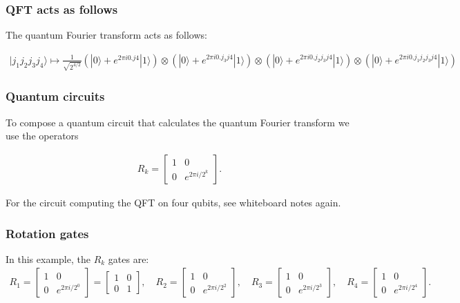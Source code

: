 \documentclass{beamer}
\begin{document}
\begin{frame}
\frametitle{QFT acts as follows}

The quantum Fourier transform acts as follows:

\begin{align*}
|j_1j_2j_3j_4 \rangle \mapsto \frac{1}{\sqrt{2^{4/2}}}
\left(|0\rangle + e^{2 \pi i 0.j4}|1\rangle \right) \otimes 
\left(|0\rangle + e^{2 \pi i 0.j_3j4}|1\rangle \right) \otimes 
\left(|0\rangle + e^{2 \pi i 0.j_2j_3j4}|1\rangle \right) \otimes 
\left(|0\rangle + e^{2 \pi i 0.j_1j_2j_3j4}|1\rangle \right) 
\end{align*}
\end{frame}

\begin{frame}
\frametitle{Quantum circuits}

To compose a quantum circuit that calculates the quantum Fourier
transform we use the operators

\begin{align*}
R_k = 
\begin{bmatrix}
1 & 0 \\
0 & e^{2\pi i/2^k}
\end{bmatrix}.
\end{align*}

For the circuit computing the QFT on four qubits, see whiteboard notes again.
\end{frame}

\begin{frame}
\frametitle{Rotation gates}

In this example, the \(R_k\) gates are:
\begin{align*}
R_1 = \begin{bmatrix}
1 & 0 \\
0 & e^{2 \pi i /2^0}
\end{bmatrix} = 
\begin{bmatrix}
1 & 0 \\
0 & 1
\end{bmatrix}, \quad 
R_2 = \begin{bmatrix}
1 & 0 \\
0 & e^{2 \pi i /2^2}
\end{bmatrix}, \quad 
R_3 = \begin{bmatrix}
1 & 0 \\
0 & e^{2 \pi i /2^3}
\end{bmatrix}, \quad 
R_4 = \begin{bmatrix}
1 & 0 \\
0 & e^{2 \pi i /2^4}
\end{bmatrix}.
\end{align*}
\end{frame}
\end{document}
